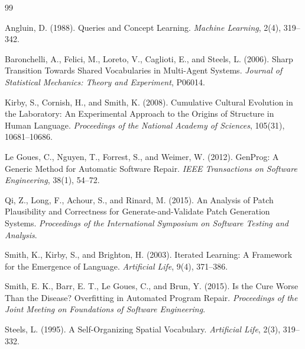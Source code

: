 \documentclass[11pt]{article}
\begin{document}
\begin{thebibliography}{99}

Angluin, D. (1988). Queries and Concept Learning. \emph{Machine Learning}, 2(4), 319--342.

Baronchelli, A., Felici, M., Loreto, V., Caglioti, E., and Steels, L. (2006). Sharp Transition Towards Shared Vocabularies in Multi-Agent Systems. \emph{Journal of Statistical Mechanics: Theory and Experiment}, P06014.

Kirby, S., Cornish, H., and Smith, K. (2008). Cumulative Cultural Evolution in the Laboratory: An Experimental Approach to the Origins of Structure in Human Language. \emph{Proceedings of the National Academy of Sciences}, 105(31), 10681--10686.

Le Goues, C., Nguyen, T., Forrest, S., and Weimer, W. (2012). GenProg: A Generic Method for Automatic Software Repair. \emph{IEEE Transactions on Software Engineering}, 38(1), 54--72.

Qi, Z., Long, F., Achour, S., and Rinard, M. (2015). An Analysis of Patch Plausibility and Correctness for Generate-and-Validate Patch Generation Systems. \emph{Proceedings of the International Symposium on Software Testing and Analysis}.

Smith, K., Kirby, S., and Brighton, H. (2003). Iterated Learning: A Framework for the Emergence of Language. \emph{Artificial Life}, 9(4), 371--386.

Smith, E. K., Barr, E. T., Le Goues, C., and Brun, Y. (2015). Is the Cure Worse Than the Disease? Overfitting in Automated Program Repair. \emph{Proceedings of the Joint Meeting on Foundations of Software Engineering}.

Steels, L. (1995). A Self-Organizing Spatial Vocabulary. \emph{Artificial Life}, 2(3), 319--332.

\end{thebibliography}
\end{document}
